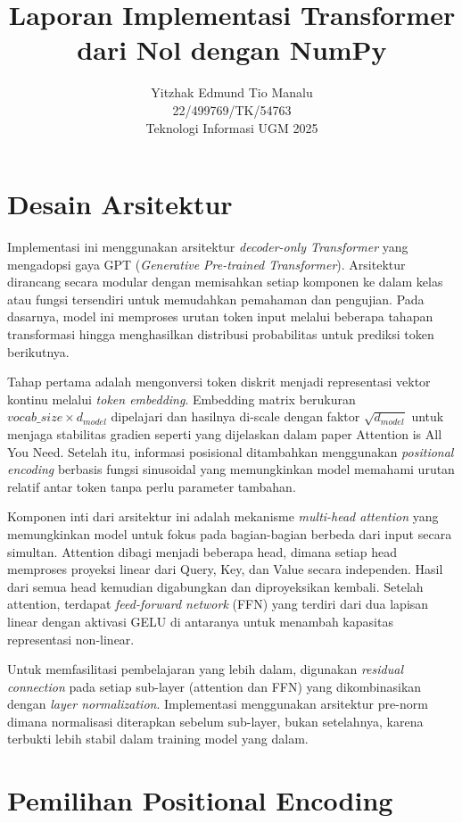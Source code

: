 \documentclass[11pt,a4paper]{article}
\title{\textbf{Laporan Implementasi Transformer dari Nol dengan NumPy}}
\author{
    Yitzhak Edmund Tio Manalu \\
    22/499769/TK/54763 \\
    Teknologi Informasi UGM 2025
}
\date{}
\begin{document}
\maketitle

\section{Desain Arsitektur}

Implementasi ini menggunakan arsitektur \textit{decoder-only Transformer} yang mengadopsi gaya GPT (\textit{Generative Pre-trained Transformer}). Arsitektur dirancang secara modular dengan memisahkan setiap komponen ke dalam kelas atau fungsi tersendiri untuk memudahkan pemahaman dan pengujian. Pada dasarnya, model ini memproses urutan token input melalui beberapa tahapan transformasi hingga menghasilkan distribusi probabilitas untuk prediksi token berikutnya.

Tahap pertama adalah mengonversi token diskrit menjadi representasi vektor kontinu melalui \textit{token embedding}. Embedding matrix berukuran $vocab\_size \times d_{model}$ dipelajari dan hasilnya di-scale dengan faktor $\sqrt{d_{model}}$ untuk menjaga stabilitas gradien seperti yang dijelaskan dalam paper Attention is All You Need. Setelah itu, informasi posisional ditambahkan menggunakan \textit{positional encoding} berbasis fungsi sinusoidal yang memungkinkan model memahami urutan relatif antar token tanpa perlu parameter tambahan.

Komponen inti dari arsitektur ini adalah mekanisme \textit{multi-head attention} yang memungkinkan model untuk fokus pada bagian-bagian berbeda dari input secara simultan. Attention dibagi menjadi beberapa head, dimana setiap head memproses proyeksi linear dari Query, Key, dan Value secara independen. Hasil dari semua head kemudian digabungkan dan diproyeksikan kembali. Setelah attention, terdapat \textit{feed-forward network} (FFN) yang terdiri dari dua lapisan linear dengan aktivasi GELU di antaranya untuk menambah kapasitas representasi non-linear.

Untuk memfasilitasi pembelajaran yang lebih dalam, digunakan \textit{residual connection} pada setiap sub-layer (attention dan FFN) yang dikombinasikan dengan \textit{layer normalization}. Implementasi menggunakan arsitektur pre-norm dimana normalisasi diterapkan sebelum sub-layer, bukan setelahnya, karena terbukti lebih stabil dalam training model yang dalam.

\section{Pemilihan Positional Encoding}
\end{document}
